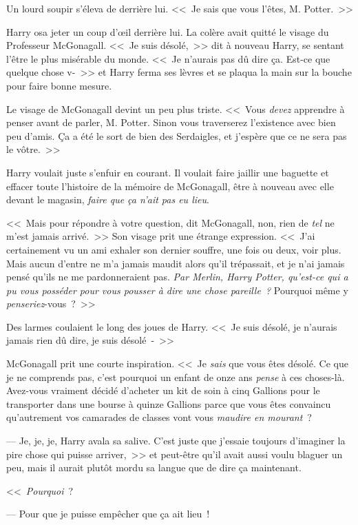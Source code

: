 Un lourd soupir s'éleva de derrière lui. <<~Je sais que vous l'êtes, M. Potter.~>>

Harry osa jeter un coup d'œil derrière lui. La colère avait quitté le visage du Professeur McGonagall. <<~Je suis désolé,~>> dit à nouveau Harry, se sentant l'être le plus misérable du monde. <<~Je n'aurais pas dû dire ça. Est-ce que quelque chose v-~>> et Harry ferma ses lèvres et se plaqua la main sur la bouche pour faire bonne mesure.

Le visage de McGonagall devint un peu plus triste. <<~Vous \emph{devez} apprendre à penser avant de parler, M. Potter. Sinon vous traverserez l'existence avec bien peu d'amis. Ça a été le sort de bien des Serdaigles, et j'espère que ce ne sera pas le vôtre.~>>

Harry voulait juste s'enfuir en courant. Il voulait faire jaillir une baguette et effacer toute l'histoire de la mémoire de McGonagall, être à nouveau avec elle devant le magasin, \emph{faire que ça n'ait pas eu lieu}.

<<~Mais pour répondre à votre question, dit McGonagall, non, rien de \emph{tel} ne m'est jamais arrivé.~>> Son visage prit une étrange expression. <<~J'ai certainement vu un ami exhaler son dernier souffre, une fois ou deux, voir plus. Mais aucun d'entre ne m'a jamais maudit alors qu'il trépassait, et je n'ai jamais pensé qu'ils ne me pardonneraient pas. \emph{Par Merlin, Harry Potter, qu'est-ce qui a pu vous posséder pour vous pousser à dire une chose pareille~?} Pourquoi même y \emph{penseriez}-vous~?~>>

Des larmes coulaient le long des joues de Harry. <<~Je suis désolé, je n'aurais jamais rien dû dire, je suis désolé~-~>>

McGonagall prit une courte inspiration. <<~Je \emph{sais} que vous êtes désolé. Ce que je ne comprends pas, c'est pourquoi un enfant de onze ans \emph{pense} à ces choses-là. Avez-vous vraiment décidé d'acheter un kit de soin à cinq Gallions pour le transporter dans une bourse à quinze Gallions parce que vous êtes convaincu qu'autrement vos camarades de classes vont vous \emph{maudire en mourant}~?

--- Je, je,  je, Harry avala sa salive. C'est juste que j'essaie toujours d'imaginer la pire chose qui puisse arriver,~>> et peut-être qu'il avait aussi voulu blaguer un peu, mais il aurait plutôt mordu sa langue que de dire ça maintenant.

<<~\emph{Pourquoi}~?

--- Pour que je puisse empêcher que ça ait lieu~!

